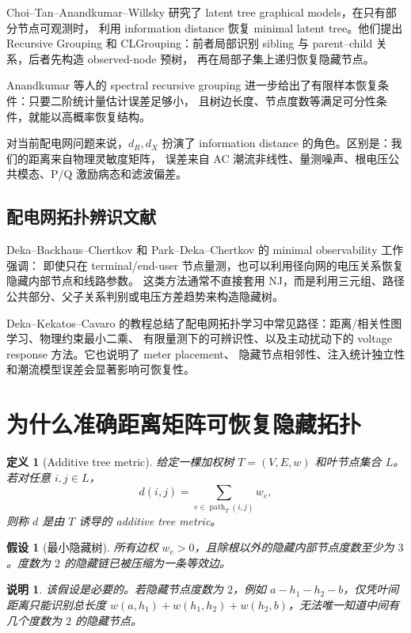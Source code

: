 \documentclass[UTF8,11pt]{ctexart}
\newtheorem{definition}{定义}
\newtheorem{assumption}{假设}
\newtheorem{remark}{说明}
\begin{document}
Choi--Tan--Anandkumar--Willsky 研究了 latent tree graphical models，在只有部分节点可观测时，
利用 information distance 恢复 minimal latent tree。他们提出 Recursive Grouping 和
CLGrouping：前者局部识别 sibling 与 parent--child 关系，后者先构造 observed-node 预树，
再在局部子集上递归恢复隐藏节点。

Anandkumar 等人的 spectral recursive grouping 进一步给出了有限样本恢复条件：只要二阶统计量估计误差足够小，
且树边长度、节点度数等满足可分性条件，就能以高概率恢复结构。

对当前配电网问题来说，$d_R,d_X$ 扮演了 information distance 的角色。区别是：我们的距离来自物理灵敏度矩阵，
误差来自 AC 潮流非线性、量测噪声、根电压公共模态、P/Q 激励病态和滤波偏差。

\subsection{配电网拓扑辨识文献}

Deka--Backhaus--Chertkov 和 Park--Deka--Chertkov 的 minimal observability 工作强调：
即使只在 terminal/end-user 节点量测，也可以利用径向网的电压关系恢复隐藏内部节点和线路参数。
这类方法通常不直接套用 NJ，而是利用三元组、路径公共部分、父子关系判别或电压方差趋势来构造隐藏树。

Deka--Kekatos--Cavaro 的教程总结了配电网拓扑学习中常见路径：距离/相关性图学习、物理约束最小二乘、
有限量测下的可辨识性、以及主动扰动下的 voltage response 方法。它也说明了 meter placement、
隐藏节点相邻性、注入统计独立性和潮流模型误差会显著影响可恢复性。

\section{为什么准确距离矩阵可恢复隐藏拓扑}

\begin{definition}[Additive tree metric]
给定一棵加权树 $T=(V,E,w)$ 和叶节点集合 $L$。若对任意 $i,j\in L$，
\begin{equation}
  d(i,j)=\sum_{e\in \operatorname{path}_T(i,j)} w_e,
\end{equation}
则称 $d$ 是由 $T$ 诱导的 additive tree metric。
\end{definition}

\begin{assumption}[最小隐藏树]
所有边权 $w_e>0$，且除根以外的隐藏内部节点度数至少为 $3$。度数为 $2$ 的隐藏链已被压缩为一条等效边。
\end{assumption}

\begin{remark}
该假设是必要的。若隐藏节点度数为 $2$，例如 $a-h_1-h_2-b$，仅凭叶间距离只能识别总长度
$w(a,h_1)+w(h_1,h_2)+w(h_2,b)$，无法唯一知道中间有几个度数为 $2$ 的隐藏节点。
\end{remark}
\end{document}
